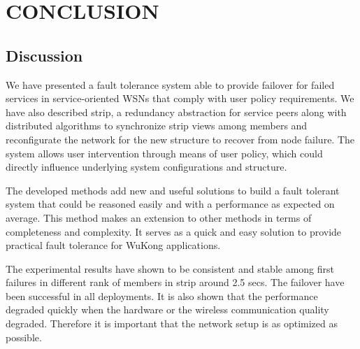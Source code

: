 \cleardoublepage
\singlespacing
\chapter{CONCLUSION}
\label{c:conclusion}
\doublespacing\nointerlineskip


\section{Discussion}

We have presented a fault tolerance system able to provide failover for failed
services in service-oriented WSNs that comply with user policy requirements. We
have also described strip, a redundancy abstraction for service peers along with
distributed algorithms to synchronize strip views among members and
reconfigurate the network for the new structure to recover from node failure.
The system allows user intervention through means of user policy, which could
directly influence underlying system configurations and structure.

The developed methods add new and useful solutions to build a fault tolerant
system that could be reasoned easily and with a performance as expected on
average. This method makes an extension to other methods in terms of
completeness and complexity. It serves as a quick and easy solution
to provide practical fault tolerance for WuKong applications.


The experimental results have shown to be consistent and stable among first
failures in different rank of members in strip around 2.5 secs. The failover
have been successful in all deployments. It is also shown that the performance
degraded quickly when the hardware or the wireless communication quality
degraded. Therefore it is important that the network setup is as optimized as
possible. 

